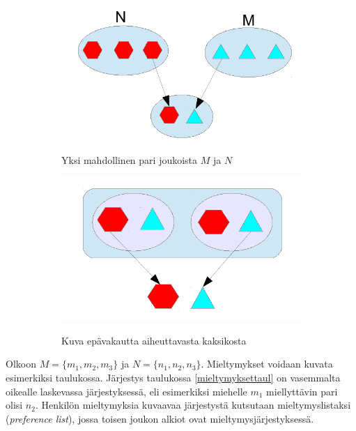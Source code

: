 \documentclass[finnish]{tktltiki2}
\theoremstyle{definition}
\theoremstyle{remark}
\begin{document}
\begin{figure}[t]
	\begin{subfigure}{.6\textwidth}
	\includegraphics[scale=0.6]{paritutk}
	\caption{Yksi mahdollinen pari joukoista $M$ ja $N$}
	\label{pari}
	\end{subfigure}
	\begin{subfigure}{.3\textwidth}
	\includegraphics[scale=0.6]{vakaatutk}\label{epävakaa}
	\caption{Kuva epävakautta aiheuttavasta kaksikosta}
	\label{epävakaus}
	\end{subfigure}
	\caption{}
\end{figure}


Olkoon $M = \{m_1, m_2, m_3\}$ ja $N = \{n_1, n_2, n_3\}$. Mieltymykset voidaan kuvata esimerkiksi taulukossa. Järjestys taulukossa \ref{mieltymyksettaul} on vasemmalta oikealle laskevassa järjestyksessä, eli esimerkiksi miehelle $m_1$ miellyttävin pari olisi $n_2$. Henkilön mieltymyksia kuvaavaa järjestystä kutsutaan mieltymyslistaksi (\emph{preference list}), jossa toisen joukon alkiot ovat mieltymysjärjestyksessä.
\end{document}
